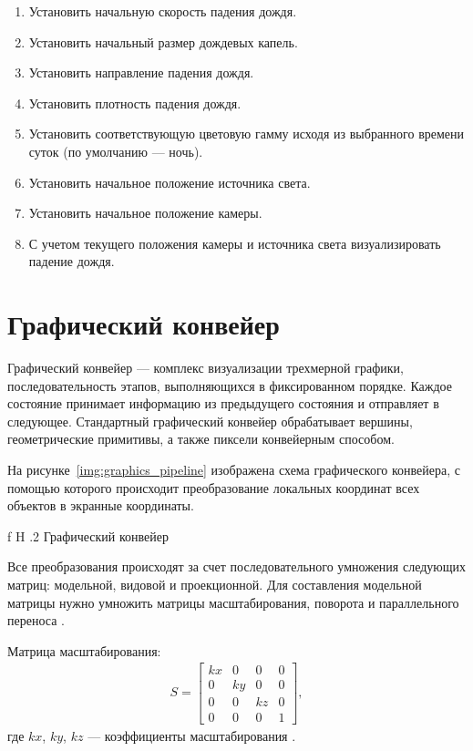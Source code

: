 \begin{enumerate}
\item
Установить начальную скорость падения дождя.
\item
Установить начальный размер дождевых капель.
\item
Установить направление падения дождя.
\item
Установить плотность падения дождя.
\item
Установить соответствующую цветовую гамму исходя из выбранного времени суток (по умолчанию --- ночь).
\item
Установить начальное положение источника света.
\item
Установить начальное положение камеры.
\item
С учетом текущего положения камеры и источника света визуализировать падение дождя.
\end{enumerate}

\section{Графический конвейер}

Графический конвейер --- комплекс визуализации трехмерной графики, последовательность этапов, выполняющихся в фиксированном порядке. 
Каждое состояние принимает информацию из предыдущего состояния и отправляет в следующее. 
Стандартный графический конвейер обрабатывает вершины, геометрические примитивы, а также пиксели конвейерным способом.

На рисунке~\ref{img:graphics_pipeline} изображена схема графического конвейера, с помощью которого происходит преобразование локальных координат всех объектов в экранные координаты.

    {f}
    {H}
    {.2\textwidth}
    {Графический конвейер}
    
Все преобразования происходят за счет последовательного умножения следующих матриц: модельной, видовой и проекционной. 
Для составления модельной матрицы нужно умножить матрицы масштабирования, поворота и параллельного переноса \cite{Jeremiah2011}. 

Матрица масштабирования:
\begin{equation}
\begin{gathered}
S = 
	\begin{bmatrix}
		kx & 0 & 0 & 0 \\
		0 & ky & 0 & 0 \\
		0 & 0 & kz & 0 \\
		0 & 0 & 0 & 1
	\end{bmatrix},
\end{gathered}
\end{equation}
где $kx$, $ky$, $kz$ --- коэффициенты масштабирования \cite{Panov2017}.

